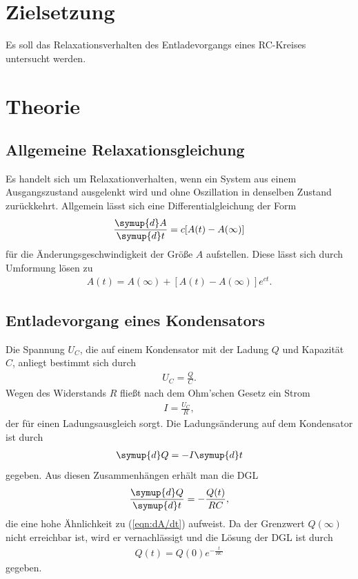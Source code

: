\section{Zielsetzung}
\label{sec:Zielsetzung}
Es soll das Relaxationsverhalten des Entladevorgangs eines RC-Kreises untersucht werden.

\section{Theorie}
\label{sec:Theorie}

\subsection{Allgemeine Relaxationsgleichung}
\label{sec:AllgemeineRelaxationsgleichung}

Es handelt sich um Relaxationverhalten, wenn ein System aus einem Ausgangszustand ausgelenkt wird und ohne Oszillation in denselben
Zustand zurückkehrt. Allgemein lässt sich eine Differentialgleichung der Form
\begin{align}
    \label{eqn:dA/dt}
    \frac{\symup{d}A}{\symup{d}t} = c[A(t)-A(\infty)]
\end{align}
für die Änderungsgeschwindigkeit der Größe $A$ aufstellen. Diese lässt sich durch Umformung lösen zu
\begin{align}
    \label{eqn:AllgemeineRelaxationsgleichung}
    A(t)=A(\infty)+[A(t)-A(\infty)]e^{ct}.
\end{align}

\subsection{Entladevorgang eines Kondensators}
\label{sec:EntladekurveeinesKondensators}

Die Spannung $U_C$, die auf einem Kondensator mit der Ladung $Q$ und Kapazität $C$, anliegt bestimmt sich durch
\begin{align*}
    U_C=\frac{Q}{C}.
\end{align*}
Wegen des Widerstands $R$ fließt nach dem Ohm'schen Gesetz ein Strom
\begin{align*}
    I=\frac{U_C}{R},
\end{align*}
der für einen Ladungsausgleich sorgt. Die Ladungsänderung auf dem Kondensator ist durch
\begin{align*}
    \symup{d}Q=-I\symup{d}t
\end{align*}
gegeben. Aus diesen Zusammenhängen erhält man die DGL
\begin{align}
    \label{eqn:dQ/dt}
    \frac{\symup{d}Q}{\symup{d}t}=-\frac{Q(t)}{RC},
\end{align}
die eine hohe Ähnlichkeit zu (\ref{eqn:dA/dt}) aufweist. Da der Grenzwert $Q(\infty)$ nicht erreichbar ist, wird er vernachlässigt und die Lösung
der DGL ist durch
\begin{align}
    \label{eqn:Entladung}
    Q(t)=Q(0)e^{-\frac{t}{RC}}
\end{align}
gegeben.

